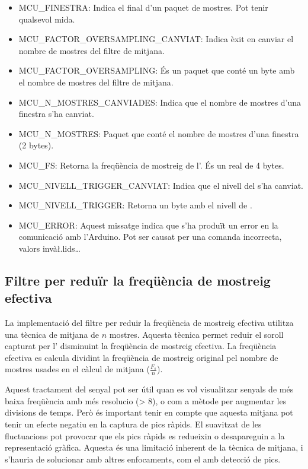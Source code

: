 \documentclass{tfgitic}[2023/07/07]
\begin{document}
\begin{itemize}
\item MCU\_FINESTRA: Indica el final d'un paquet de mostres. Pot tenir
  qualsevol mida.
\item MCU\_FACTOR\_OVERSAMPLING\_CANVIAT: Indica èxit en canviar el
  nombre de mostres del filtre de mitjana.
\item MCU\_FACTOR\_OVERSAMPLING: És un paquet que conté un byte amb el
  nombre de mostres del filtre de mitjana.
\item MCU\_N\_MOSTRES\_CANVIADES: Indica que el nombre de mostres
  d'una finestra s'ha canviat.
\item MCU\_N\_MOSTRES: Paquet que conté el nombre de mostres d'una
  finestra (2 bytes).
\item MCU\_FS: Retorna la freqüència de mostreig de l'. És
  un real de \num{4} bytes.
\item MCU\_NIVELL\_TRIGGER\_CANVIAT: Indica que el nivell del
   s'ha canviat.
\item MCU\_NIVELL\_TRIGGER: Retorna un byte amb el nivell de
  .
\item MCU\_ERROR: Aquest missatge indica que s'ha produït un error en
  la comunicació amb l'Arduino. Pot ser causat per una comanda
  incorrecta, valors invà\l.lids\dots
\end{itemize}

\subsection{Filtre per reduïr la freqüència de mostreig efectiva}

La implementació del filtre per reduir la freqüència de mostreig
efectiva utilitza una tècnica de mitjana de $n$ mostres. Aquesta
tècnica permet reduir el soroll capturat per l' disminuint
la freqüència de mostreig efectiva. La freqüència efectiva es calcula
dividint la freqüència de mostreig original pel nombre de mostres
usades en el càlcul de mitjana ($\frac{F_{s}}{n}$).

Aquest tractament del senyal pot ser útil quan es vol visualitzar
senyals de més baixa freqüència amb més resolucio (> \SI{8}{\bits}), o
com a mètode per augmentar les divisions de temps. Però és important
tenir en compte que aquesta mitjana pot tenir un efecte negatiu en la
captura de pics ràpids. El suavitzat de les fluctuacions pot
provocar que els pics ràpids es redueixin o desapareguin a la
representació gràfica. Aquesta és una limitació inherent de la tècnica
de mitjana, i s'hauria de solucionar amb altres enfocaments, com el
 amb detecció de pics.
\end{document}
